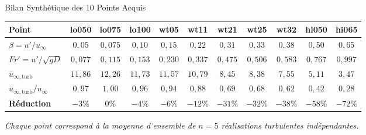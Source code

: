 \documentclass[11pt,aspectratio=169]{beamer}
\begin{document}
\begin{frame}{Bilan Synthétique des 10 Points Acquis}
  \scriptsize
  \centering
  \renewcommand{\arraystretch}{1.2}
  \setlength{\tabcolsep}{3.5pt}
  \begin{tabular}{lcccccccccc}
    \toprule
    \textbf{Point} & \textbf{lo050} & \textbf{lo075} & \textbf{lo100} & \textbf{wt05} & \textbf{wt11} & \textbf{wt21} & \textbf{wt25} & \textbf{wt32} & \textbf{hi050} & \textbf{hi065} \\
    \midrule
    $\beta = u'/u_\infty$ & $0{,}05$ & $0{,}075$ & $0{,}10$ & $0{,}15$ & $0{,}22$ & $0{,}31$ & $0{,}33$ & $0{,}38$ & $0{,}50$ & $0{,}65$ \\
    $Fr' = u'/\sqrt{gD}$ & $0{,}077$ & $0{,}115$ & $0{,}153$ & $0{,}230$ & $0{,}337$ & $0{,}475$ & $0{,}506$ & $0{,}583$ & $0{,}767$ & $0{,}997$ \\
    $\bar{u}_{\infty,\text{turb}}$ & $11{,}86$ & $12{,}26$ & $11{,}73$ & $11{,}57$ & $10{,}79$ & $8{,}45$ & $8{,}38$ & $7{,}55$ & $5{,}11$ & $3{,}47$ \\
    $\bar{u}_{\infty,\text{turb}}/u_\infty$ & $0{,}97$ & $1{,}00$ & $0{,}96$ & $0{,}94$ & $0{,}88$ & $0{,}69$ & $0{,}68$ & $0{,}62$ & $0{,}42$ & $0{,}28$ \\
    \textbf{Réduction} & \textbf{$-3\%$} & \textbf{$0\%$} & \textbf{$-4\%$} & \textbf{$-6\%$} & \textbf{$-12\%$} & \textbf{$-31\%$} & \textbf{$-32\%$} & \textbf{$-38\%$} & \textbf{$-58\%$} & \textbf{$-72\%$} \\
    \bottomrule
  \end{tabular}

  \vspace{0.3cm}
  \textit{Chaque point correspond à la moyenne d'ensemble de $n=5$ réalisations turbulentes indépendantes.}
\end{frame}
\end{document}
